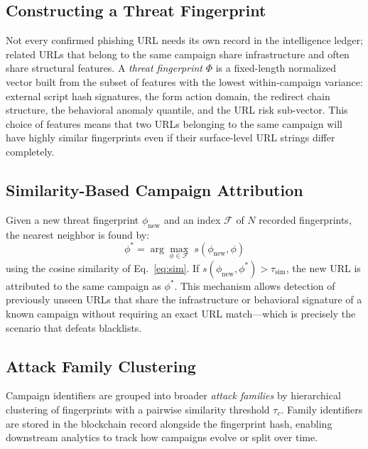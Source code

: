 \documentclass[conference]{IEEEtran}
\begin{document}
\subsection{Constructing a Threat Fingerprint}
Not every confirmed phishing URL needs its own record in the intelligence ledger; related URLs
that belong to the same campaign share infrastructure and often share structural features.
A \textit{threat fingerprint} $\Phi$ is a fixed-length normalized vector built from the subset
of features with the lowest within-campaign variance: external script hash signatures, the form
action domain, the redirect chain structure, the behavioral anomaly quantile, and the URL risk
sub-vector.
This choice of features means that two URLs belonging to the same campaign will have highly
similar fingerprints even if their surface-level URL strings differ completely.

\subsection{Similarity-Based Campaign Attribution}
Given a new threat fingerprint $\phi_{\text{new}}$ and an index $\mathcal{F}$ of $N$ recorded
fingerprints, the nearest neighbor is found by:
\begin{equation}
  \phi^* = \arg\max_{\phi\in\mathcal{F}}\;s(\phi_{\text{new}}, \phi)
  \label{eq:nn}
\end{equation}
using the cosine similarity of Eq.~\eqref{eq:sim}.
If $s(\phi_{\text{new}},\phi^*) > \tau_{\mathrm{sim}}$, the new URL is attributed to the same
campaign as $\phi^*$.
This mechanism allows detection of previously unseen URLs that share the infrastructure or
behavioral signature of a known campaign without requiring an exact URL match---which is
precisely the scenario that defeats blacklists.

\subsection{Attack Family Clustering}
Campaign identifiers are grouped into broader \textit{attack families} by hierarchical clustering
of fingerprints with a pairwise similarity threshold $\tau_c$.
Family identifiers are stored in the blockchain record alongside the fingerprint hash, enabling
downstream analytics to track how campaigns evolve or split over time.

\end{document}
